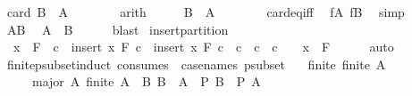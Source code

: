 \begin{isabellebody}
\ {\isachardoublequoteopen}card\ {\isacharparenleft}{\kern0pt}B\ {\isacharminus}{\kern0pt}\ A{\isacharparenright}{\kern0pt}\ {\isacharequal}{\kern0pt}\ {}{\isachardoublequoteclose}\isanewline
\ \ \ \ \isamarkupfalse%
\ arith\isanewline
\ \ \isamarkupfalse%
\ \isamarkupfalse%
\ {\isachardoublequoteopen}B\ {\isacharminus}{\kern0pt}\ A\ {\isacharequal}{\kern0pt}\ {\isacharbraceleft}{\kern0pt}{\isacharbraceright}{\kern0pt}{\isachardoublequoteclose}\isanewline
\ \ \ \ \isamarkupfalse%
\ card{\isacharunderscore}{\kern0pt}eq{\isacharunderscore}{\kern0pt}{}{\isacharunderscore}{\kern0pt}iff\ \isamarkupfalse%
\ fA\ fB\ \isamarkupfalse%
\ simp\isanewline
\ \ \isamarkupfalse%
\ AB\ \isamarkupfalse%
\ {\isachardoublequoteopen}A\ {\isacharequal}{\kern0pt}\ B{\isachardoublequoteclose}\isanewline
\ \ \ \ \isamarkupfalse%
\ blast\isanewline
{}\isamarkupfalse%
%
\endisatagproof
{\isafoldproof}%
%
\isadelimproof
\isanewline
%
\endisadelimproof
\isanewline
{}\isamarkupfalse%
\ insert{\isacharunderscore}{\kern0pt}partition{\isacharcolon}{\kern0pt}\isanewline
\ \ {\isachardoublequoteopen}x\ {\isasymnotin}\ F\ {\isasymLongrightarrow}\ {\isasymforall}c{}\ {\isasymin}\ insert\ x\ F{\isachardot}{\kern0pt}\ {\isasymforall}c{}\ {\isasymin}\ insert\ x\ F{\isachardot}{\kern0pt}\ c{}\ {\isasymnoteq}\ c{}\ {\isasymlongrightarrow}\ c{}\ {\isasyminter}\ c{}\ {\isacharequal}{\kern0pt}\ {\isacharbraceleft}{\kern0pt}{\isacharbraceright}{\kern0pt}\ {\isasymLongrightarrow}\ x\ {\isasyminter}\ {\isasymUnion}F\ {\isacharequal}{\kern0pt}\ {\isacharbraceleft}{\kern0pt}{\isacharbraceright}{\kern0pt}{\isachardoublequoteclose}\isanewline
%
\isadelimproof
\ \ %
\endisadelimproof
%
\isatagproof
{}\isamarkupfalse%
\ auto%
\endisatagproof
{\isafoldproof}%
%
\isadelimproof
\isanewline
%
\endisadelimproof
\isanewline
{}\isamarkupfalse%
\ finite{\isacharunderscore}{\kern0pt}psubset{\isacharunderscore}{\kern0pt}induct\ {\isacharbrackleft}{\kern0pt}consumes\ {}{\isacharcomma}{\kern0pt}\ case{\isacharunderscore}{\kern0pt}names\ psubset{\isacharbrackright}{\kern0pt}{\isacharcolon}{\kern0pt}\isanewline
\ \ \ finite{\isacharcolon}{\kern0pt}\ {\isachardoublequoteopen}finite\ A{\isachardoublequoteclose}\isanewline
\ \ \ \ \ major{\isacharcolon}{\kern0pt}\ {\isachardoublequoteopen}{\isasymAnd}A{\isachardot}{\kern0pt}\ finite\ A\ {\isasymLongrightarrow}\ {\isacharparenleft}{\kern0pt}{\isasymAnd}B{\isachardot}{\kern0pt}\ B\ {\isasymsubset}\ A\ {\isasymLongrightarrow}\ P\ B{\isacharparenright}{\kern0pt}\ {\isasymLongrightarrow}\ P\ A{\isachardoublequoteclose}\isanewline

\end{isabellebody}
